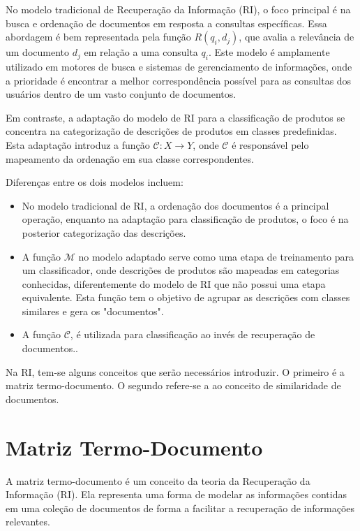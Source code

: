 No modelo tradicional de Recuperação da Informação (RI), o foco principal é na busca e ordenação de documentos em resposta a consultas específicas. Essa abordagem é bem representada pela função \( R(q_i, d_j) \), que avalia a relevância de um documento \( d_j \) em relação a uma consulta \( q_i \). Este modelo é amplamente utilizado em motores de busca e sistemas de gerenciamento de informações, onde a prioridade é encontrar a melhor correspondência possível para as consultas dos usuários dentro de um vasto conjunto de documentos.

Em contraste, a adaptação do modelo de RI para a classificação de produtos se concentra na categorização de descrições de produtos em classes predefinidas. Esta adaptação introduz a função \( \mathcal{C}: X \to Y \), onde \( \mathcal{C} \) é responsável pelo mapeamento da ordenação em sua classe correspondentes.

Diferenças entre os dois modelos incluem:

\begin{itemize}
    \item No modelo tradicional de RI, a ordenação dos documentos é a principal operação, enquanto na adaptação para classificação de produtos, o foco é na posterior categorização das descrições.
    \item A função \( \mathcal{M} \) no modelo adaptado serve como uma etapa de treinamento para um classificador, onde descrições de produtos são mapeadas em categorias conhecidas, diferentemente do modelo de RI que não possui uma etapa equivalente.  Esta função tem o objetivo de agrupar as descrições com classes similares e gera os "documentos".
    \item A função \( \mathcal{C} \), é utilizada para classificação ao invés de recuperação de documentos..
\end{itemize}

Na RI, tem-se alguns conceitos que serão necessários introduzir.  O primeiro é a matriz termo-documento.  O segundo refere-se a ao conceito de similaridade de documentos.

\section{Matriz Termo-Documento}

A matriz termo-documento é um conceito da teoria da Recuperação da Informação (RI). Ela representa uma forma de modelar as informações contidas em uma coleção de documentos de forma a facilitar a recuperação de informações relevantes.


